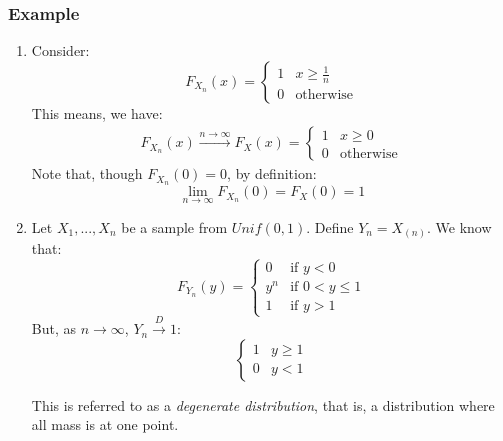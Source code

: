 \documentclass{article}
\newcommand{\ord}[1]{X_{(#1)}}
\begin{document}
\subsubsection*{Example}
\begin{enumerate}
    \item Consider:
    \begin{equation*}
        F_{X_n}(x) = \begin{cases}
            1 & x\geq \frac{1}{n}\\
            0 & \text{otherwise}
        \end{cases}
    \end{equation*}
    This means, we have:
    \begin{equation*}
        \begin{split}
            F_{X_n}(x)\xrightarrow{n\to\infty} F_X(x) = \begin{cases}
                1 & x \geq 0\\
                0 & \text{otherwise}
            \end{cases}
        \end{split}
    \end{equation*}
    Note that, though $F_{X_n}(0) = 0$, by definition:
    \begin{equation*}
        \lim_{n\to\infty}F_{X_n}(0) = F_X(0) = 1
    \end{equation*}

    \item Let $X_1,...,X_n$ be a sample from $Unif(0,1)$. Define $Y_n = \ord{n}$. We know that:
    \begin{equation*}
        F_{Y_n}(y) = \begin{cases}
            0 & \text{if } y<0\\
            y^n & \text{if } 0<y\leq 1\\
            1 & \text{if } y>1
        \end{cases}
    \end{equation*}
    But, as $n\to\infty$, $Y_n \xrightarrow{D}1$:
    \begin{equation*}
        \begin{cases}
            1 & y\geq 1\\
            0 & y < 1
        \end{cases}
    \end{equation*}
    
    This is referred to as a \textit{degenerate distribution}, that is, a distribution where all mass is at one point.
    

\end{enumerate}
\end{document}
